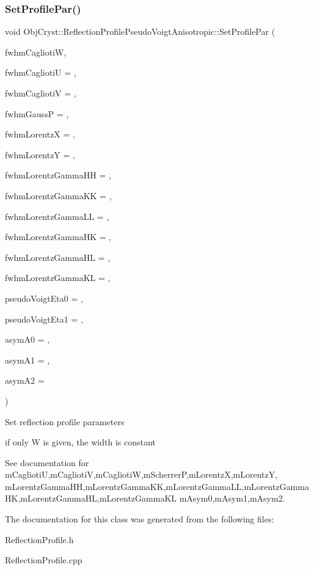 \subsubsection{\texorpdfstring{SetProfilePar()}{SetProfilePar()}}
{\footnotesize\ttfamily void Obj\+Cryst\+::\+Reflection\+Profile\+Pseudo\+Voigt\+Anisotropic\+::\+Set\+Profile\+Par (\begin{DoxyParamCaption}\item[{const R\+E\+AL}]{fwhm\+CagliotiW,  }\item[{const R\+E\+AL}]{fwhm\+CagliotiU = {},  }\item[{const R\+E\+AL}]{fwhm\+CagliotiV = {},  }\item[{const R\+E\+AL}]{fwhm\+GaussP = {},  }\item[{const R\+E\+AL}]{fwhm\+LorentzX = {},  }\item[{const R\+E\+AL}]{fwhm\+LorentzY = {},  }\item[{const R\+E\+AL}]{fwhm\+Lorentz\+Gamma\+HH = {},  }\item[{const R\+E\+AL}]{fwhm\+Lorentz\+Gamma\+KK = {},  }\item[{const R\+E\+AL}]{fwhm\+Lorentz\+Gamma\+LL = {},  }\item[{const R\+E\+AL}]{fwhm\+Lorentz\+Gamma\+HK = {},  }\item[{const R\+E\+AL}]{fwhm\+Lorentz\+Gamma\+HL = {},  }\item[{const R\+E\+AL}]{fwhm\+Lorentz\+Gamma\+KL = {},  }\item[{const R\+E\+AL}]{pseudo\+Voigt\+Eta0 = {},  }\item[{const R\+E\+AL}]{pseudo\+Voigt\+Eta1 = {},  }\item[{const R\+E\+AL}]{asym\+A0 = {},  }\item[{const R\+E\+AL}]{asym\+A1 = {},  }\item[{const R\+E\+AL}]{asym\+A2 = {} }\end{DoxyParamCaption})}

Set reflection profile parameters

if only W is given, the width is constant

See documentation for m\+CagliotiU,m\+CagliotiV,m\+CagliotiW,m\+ScherrerP,m\+LorentzX,m\+LorentzY, m\+Lorentz\+Gamma\+HH,m\+Lorentz\+Gamma\+KK,m\+Lorentz\+Gamma\+LL,m\+Lorentz\+Gamma\+HK,m\+Lorentz\+Gamma\+HL,m\+Lorentz\+Gamma\+KL m\+Asym0,m\+Asym1,m\+Asym2. 

The documentation for this class was generated from the following files\+:\begin{DoxyCompactItemize}
\item 
Reflection\+Profile.\+h\item 
Reflection\+Profile.\+cpp\end{DoxyCompactItemize}
